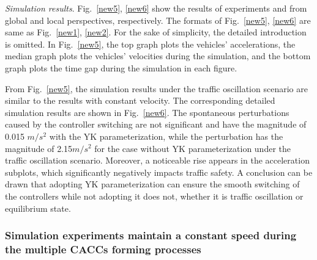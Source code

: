 \documentclass[journal]{IEEEtran}
\begin{document}



\textit{Simulation results}. Fig.~\ref{new5}, \ref{new6} show the results of experiments \uppercase\expandafter{} and \uppercase\expandafter{} from global and local perspectives, respectively. The formats of Fig.~\ref{new5}, \ref{new6} are same as Fig.~\ref{new1}, \ref{new2}. For the sake of simplicity, the detailed introduction is omitted. In Fig.~\ref{new5}, the top graph plots the vehicles' accelerations, the median graph plots the vehicles' velocities during the simulation, and the bottom graph plots the time gap during the simulation in each figure.

From Fig.~\ref{new5}, the simulation results under the traffic oscillation scenario are similar to the results with constant velocity. The corresponding detailed simulation results are shown in Fig.~\ref{new6}. The spontaneous perturbations caused by the controller switching are not significant and have the magnitude of 0.015 $m/s^2$ with the YK parameterization, while the perturbation has the magnitude of 2.15$m/s^2$ for the case without YK parameterization under the traffic oscillation scenario. Moreover, a noticeable rise appears in the acceleration subplots, which significantly negatively impacts traffic safety. A conclusion can be drawn that adopting YK parameterization can ensure the smooth switching of the controllers while not adopting it does not, whether it is traffic oscillation or equilibrium state.

\subsubsection{Simulation experiments maintain a constant speed during the multiple CACCs forming processes}
\label{Section 5.2.3}
~\\
\end{document}
